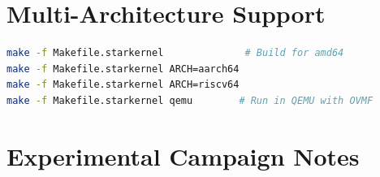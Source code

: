 
\section{Multi-Architecture Support}
\label{vol2:sec:kernel:arch}

\begin{lstlisting}[language=bash, caption={StarKernel build targets}]
make -f Makefile.starkernel              # Build for amd64
make -f Makefile.starkernel ARCH=aarch64
make -f Makefile.starkernel ARCH=riscv64
make -f Makefile.starkernel qemu        # Run in QEMU with OVMF
\end{lstlisting}

\section{Experimental Campaign Notes}
\label{vol2:sec:kernel:notes}


